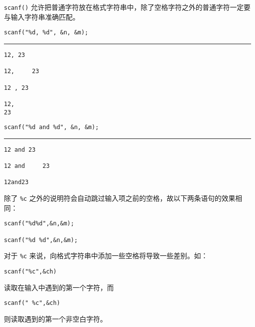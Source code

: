 \begin{frame}[fragile]
  \lstinline|scanf()| 允许把普通字符放在格式字符串中，除了空格字符之外的普通字符一定要与输入字符串准确匹配。  
\end{frame}

\begin{frame}[fragile]
\begin{lstlisting}[showspaces=true,backgroundcolor=\color{red!20}]
scanf("%d, %d", &n, &m);
\end{lstlisting}

\rule{\textwidth}{0.1em}
\begin{lstlisting}[title=合法的输入方式,showspaces=true,backgroundcolor=\color{red!20}]
12, 23

12,     23

12 , 23

12,
23
\end{lstlisting}

\end{frame}

\begin{frame}[fragile]
\begin{lstlisting}[showspaces=true,backgroundcolor=\color{red!20}]
scanf("%d and %d", &n, &m);
\end{lstlisting}

\rule{\textwidth}{0.1em}
\begin{lstlisting}[title=合法的输入方式,showspaces=true,backgroundcolor=\color{red!20}]
12 and 23

12 and     23

12and23
\end{lstlisting}
\end{frame}

\begin{frame}[fragile]

除了 \lstinline|%c| 之外的说明符会自动跳过输入项之前的空格，故以下两条语句的效果相同：
\begin{lstlisting}[showspaces=true,backgroundcolor=\color{red!10}]
scanf("%d%d",&n,&m);

scanf("%d %d",&n,&m);
\end{lstlisting}
\end{frame}

\begin{frame}[fragile]
对于 \lstinline|%c| 来说，向格式字符串中添加一些空格将导致一些差别。如：
\begin{lstlisting}[showspaces=true,backgroundcolor=\color{red!10}]
scanf("%c",&ch)
\end{lstlisting}
读取在输入中遇到的第一个字符，而
\begin{lstlisting}[showspaces=true,backgroundcolor=\color{red!10}]
scanf(" %c",&ch)
\end{lstlisting}
则读取遇到的第一个非空白字符。
\end{frame}

